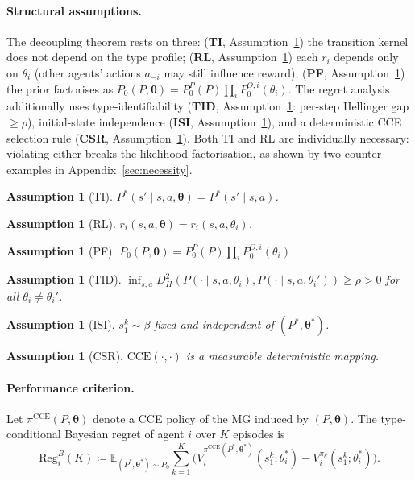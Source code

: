 ﻿\documentclass{article}
\newtheorem{assumption}[theorem]{Assumption}
\begin{document}
\paragraph{Structural assumptions.} The decoupling theorem rests on three:
(\textbf{TI}, Assumption~\ref{ass:TI}) the transition kernel does not depend on the type profile;
(\textbf{RL}, Assumption~\ref{ass:RL}) each $r_i$ depends only on $\theta_i$ (other agents' actions $a_{-i}$ may still influence reward);
(\textbf{PF}, Assumption~\ref{ass:PF}) the prior factorises as $P_0(P,\boldsymbol\theta)=P_0^P(P)\prod_i P_0^{\Theta,i}(\theta_i)$.
The regret analysis additionally uses type-identifiability (\textbf{TID}, Assumption~\ref{ass:TID}: per-step Hellinger gap $\geq\rho$), initial-state independence (\textbf{ISI}, Assumption~\ref{ass:ISI}), and a deterministic CCE selection rule (\textbf{CSR}, Assumption~\ref{ass:CSR}). Both TI and RL are individually necessary: violating either breaks the likelihood factorisation, as shown by two counter-examples in Appendix~\ref{sec:necessity}.

\begin{assumption}[TI]\label{ass:TI}$P^*(s'\!\mid\! s,a,\boldsymbol\theta)=P^*(s'\!\mid\! s,a)$.\end{assumption}
\begin{assumption}[RL]\label{ass:RL}$r_i(s,a,\boldsymbol\theta)=r_i(s,a,\theta_i)$.\end{assumption}
\begin{assumption}[PF]\label{ass:PF}$P_0(P,\boldsymbol\theta)=P_0^P(P)\prod_i P_0^{\Theta,i}(\theta_i)$.\end{assumption}
\begin{assumption}[TID]\label{ass:TID}$\inf_{s,a}D_H^2(P(\cdot\!\mid\! s,a,\theta_i),P(\cdot\!\mid\! s,a,\theta_i'))\geq\rho>0$ for all $\theta_i\!\neq\!\theta_i'$.\end{assumption}
\begin{assumption}[ISI]\label{ass:ISI}$s_1^k\sim\beta$ fixed and independent of $(P^*,\boldsymbol\theta^*)$.\end{assumption}
\begin{assumption}[CSR]\label{ass:CSR}$\mathrm{CCE}(\cdot,\cdot)$ is a measurable deterministic mapping.\end{assumption}

\paragraph{Performance criterion.} Let $\pi^{\mathrm{CCE}}(P,\boldsymbol\theta)$ denote a CCE policy of the MG induced by $(P,\boldsymbol\theta)$. The type-conditional Bayesian regret of agent $i$ over $K$ episodes is
\begin{equation}
\label{eq:regret-def}
\mathrm{Reg}_i^B(K) \!\coloneqq\! \mathbb{E}_{(P^*,\boldsymbol\theta^*)\sim P_0}\!\sum_{k=1}^K\!\Big(V_i^{\pi^{\mathrm{CCE}}(P^*,\boldsymbol\theta^*)}\!(s_1^k;\theta_i^*) - V_i^{\pi_k}(s_1^k;\theta_i^*)\Big).
\end{equation}
\end{document}
